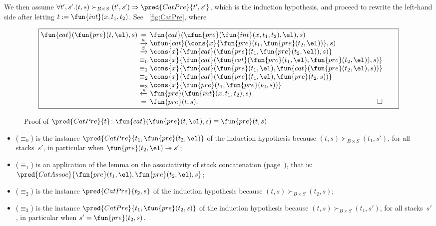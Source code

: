 We then assume \(\forall t',s'.(t,s) \succ_{B \times S} (t',s')
\Rightarrow \pred{CatPre}{t',s'}\), which is the induction hypothesis,
and proceed to rewrite the left\hyp{}hand side after letting \(t :=
\fun{int}(x,t_1,t_2)\). See \fig~\vref{fig:CatPre}, where
\begin{figure}[t]
\begin{equation*}
\boxed{%
\begin{array}{@{}r@{\;}c@{\;}l@{\qquad}}
  \fun{cat}(\fun{pre}(t,\el),s)
& =
& \fun{cat}(\ufun{pre}(\fun{int}(x,t_1,t_2),\el),s)\\
& \xrightarrow{\smash{\kappa}}
& \ufun{cat}(\cons{x}{\fun{pre}(t_1,\fun{pre}(t_2,\el))},s)\\
& \xrightarrow{\smash{\beta}}
& \cons{x}{\fun{cat}(\fun{pre}(t_1,\fun{pre}(t_2,\el)),s)}\\
& \equiv_0
& \cons{x}{\fun{cat}(\fun{cat}(\fun{pre}(t_1,\el),\fun{pre}(t_2,\el)),s)}\\
& \equiv_1
& \cons{x}{\fun{cat}(\fun{pre}(t_1,\el),\fun{cat}(\fun{pre}(t_2,\el),s))}\\
& \equiv_2
& \cons{x}{\fun{cat}(\fun{pre}(t_1,\el),\fun{pre}(t_2,s))}\\
& \equiv_3
& \cons{x}{\fun{pre}(t_1,\fun{pre}(t_2,s))}\\
& \xleftarrow{\smash{\kappa}}
& \fun{pre}(\fun{int}(x,t_1,t_2),s)\\
& =
& \fun{pre}(t,s). \hfill\Box
\end{array}}
\end{equation*}
\caption{Proof of \(\pred{CatPre}{t} \colon
  \fun{cat}(\fun{pre}(t,\el),s) \equiv \fun{pre}(t,s)\)}
\label{fig:CatPre}
\end{figure}
\begin{itemize}

  \item (\(\equiv_0\)) is the instance
  \(\pred{CatPre}{t_1,\fun{pre}(t_2,\el)}\) of the induction
  hypothesis because \((t,s) \succ_{B \times S} (t_1,s')\), for all
  stacks~\(s'\), in particular when \(\fun{pre}(t_2,\el)
  \twoheadrightarrow s'\);

  \item (\(\equiv_1\)) is an application of the lemma on the
  associativity of stack concatenation
  (page~\pageref{proof:assoc_cat}), that is:
  \(\pred{CatAssoc}{\fun{pre}(t_1,\el),\fun{pre}(t_2,\el),s}\);

  \item (\(\equiv_2\)) is the instance
  \(\pred{CatPre}{t_2,s}\) of the
  induction hypothesis because \((t,s) \succ_{B \times S} (t_2,s)\);

  \item (\(\equiv_3\)) is the instance \(\pred{CatPre}{t_1,
    \fun{pre}(t_2,s)}\) of the induction hypothesis because \((t,s)
    \succ_{B \times S} (t_1,s')\), for all stacks~\(s'\), in
    particular when \(s' = \fun{pre}(t_2,s)\).
\end{itemize}
